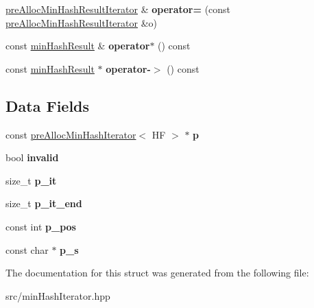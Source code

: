 \begin{DoxyCompactItemize}
\hyperlink{structpreAllocMinHashResultIterator}{pre\+Alloc\+Min\+Hash\+Result\+Iterator} \& {\bfseries operator=} (const \hyperlink{structpreAllocMinHashResultIterator}{pre\+Alloc\+Min\+Hash\+Result\+Iterator} \&o)
\item 
\mbox{\label{structpreAllocMinHashResultIterator_a7f721fc940c727f461c5011db94e1f29}} 
const \hyperlink{structminHashResult}{min\+Hash\+Result} \& {\bfseries operator$\ast$} () const
\item 
\mbox{\label{structpreAllocMinHashResultIterator_a85ca85c70949cc8a5b53176696dafa8d}} 
const \hyperlink{structminHashResult}{min\+Hash\+Result} $\ast$ {\bfseries operator-\/$>$} () const
\end{DoxyCompactItemize}
\subsection*{Data Fields}
\begin{DoxyCompactItemize}
\item 
\mbox{\label{structpreAllocMinHashResultIterator_a98c6a7f563fb0fa775cb69ce0ff1d145}} 
const \hyperlink{classpreAllocMinHashIterator}{pre\+Alloc\+Min\+Hash\+Iterator}$<$ HF $>$ $\ast$ {\bfseries p}
\item 
\mbox{\label{structpreAllocMinHashResultIterator_a518f555db58024338d64f80512f01819}} 
bool {\bfseries invalid}
\item 
\mbox{\label{structpreAllocMinHashResultIterator_ae26d80aa03e5e2f796785b8c79b24993}} 
size\+\_\+t {\bfseries p\+\_\+it}
\item 
\mbox{\label{structpreAllocMinHashResultIterator_a89377ef2beb5dbee8102f882adc81095}} 
size\+\_\+t {\bfseries p\+\_\+it\+\_\+end}
\item 
\mbox{\label{structpreAllocMinHashResultIterator_ae5cd4a940ba8806ed5d5f4769251fcd5}} 
const int {\bfseries p\+\_\+pos}
\item 
\mbox{\label{structpreAllocMinHashResultIterator_a6efd11425f3a9f2033453a1adbd88753}} 
const char $\ast$ {\bfseries p\+\_\+s}
\end{DoxyCompactItemize}


The documentation for this struct was generated from the following file\+:\begin{DoxyCompactItemize}
\item 
src/min\+Hash\+Iterator.\+hpp\end{DoxyCompactItemize}
